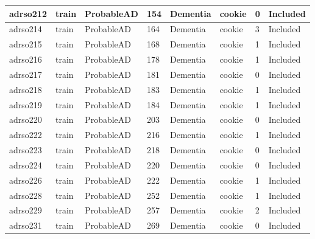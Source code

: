 \begin{center}
\begin{longtable}{|l|l|l|l|l|l|l|l|}
adrso212  & train            & ProbableAD   & 154         & Dementia             & cookie          & 0                & Included      \\ \hline
adrso214  & train            & ProbableAD   & 164         & Dementia             & cookie          & 3                & Included      \\ \hline
adrso215  & train            & ProbableAD   & 168         & Dementia             & cookie          & 1                & Included      \\ \hline
adrso216  & train            & ProbableAD   & 178         & Dementia             & cookie          & 1                & Included      \\ \hline
adrso217  & train            & ProbableAD   & 181         & Dementia             & cookie          & 0                & Included      \\ \hline
adrso218  & train            & ProbableAD   & 183         & Dementia             & cookie          & 1                & Included      \\ \hline
adrso219  & train            & ProbableAD   & 184         & Dementia             & cookie          & 1                & Included      \\ \hline
adrso220  & train            & ProbableAD   & 203         & Dementia             & cookie          & 0                & Included      \\ \hline
adrso222  & train            & ProbableAD   & 216         & Dementia             & cookie          & 1                & Included      \\ \hline
adrso223  & train            & ProbableAD   & 218         & Dementia             & cookie          & 0                & Included      \\ \hline
adrso224  & train            & ProbableAD   & 220         & Dementia             & cookie          & 0                & Included      \\ \hline
adrso226  & train            & ProbableAD   & 222         & Dementia             & cookie          & 1                & Included      \\ \hline
adrso228  & train            & ProbableAD   & 252         & Dementia             & cookie          & 1                & Included      \\ \hline
adrso229  & train            & ProbableAD   & 257         & Dementia             & cookie          & 2                & Included      \\ \hline
adrso231  & train            & ProbableAD   & 269         & Dementia             & cookie          & 0                & Included      \\ \hline

\end{longtable}
\end{center}
